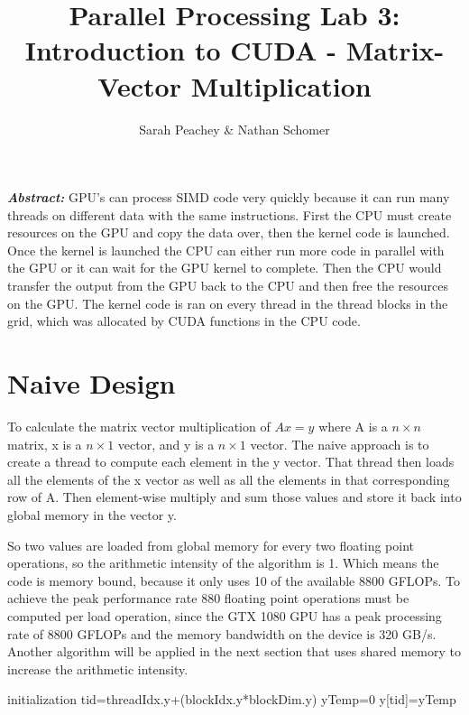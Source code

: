 \documentclass[12pt]{article}
\begin{document}
\title{Parallel Processing Lab 3: \\ Introduction to CUDA - Matrix-Vector
Multiplication}
\author{Sarah Peachey \& Nathan Schomer}
\maketitle

\textbf{\textit{Abstract:}} GPU's can process SIMD code very quickly because
it can run many threads on different data with the same instructions. First
the CPU must create resources on the GPU and copy the data over, then the
kernel code is launched. Once the kernel is launched the CPU can either run
more code in parallel with the GPU or it can wait for the GPU kernel to
complete. Then the CPU would transfer the output from the GPU back to the CPU 
and then free the resources on the GPU. The kernel code is ran on every
thread in the thread blocks in the grid, which was allocated by CUDA
functions in the CPU code.   
\newpage

\vspace{-1.5cm}
\section{Naive Design}
\vspace{-0.25cm}

\qquad To calculate the matrix vector multiplication of $Ax=y$ where A is a
$n \times n$ matrix, x is a $n \times 1$ vector, and y is a $n \times 1$
vector. The naive approach is to create a thread to compute each element in
the y vector. That thread then loads all the elements of the x vector as
well as all the elements in that corresponding row of A. Then element-wise
multiply and sum those values and store it back into global memory in the
vector y. 

So two values are loaded from global memory for every two floating
point operations, so the arithmetic intensity of the algorithm is 1. Which
means the code is memory bound, because it only uses 10 of the available 8800
GFLOPs. To achieve the peak
performance rate 880 floating point operations must be computed per load
operation, since the GTX 1080 GPU has a peak processing rate of 8800 GFLOPs and
the memory bandwidth on the device is 320 GB/s. Another algorithm will be
applied in the next section that uses shared memory to increase the
arithmetic intensity.  

\vspace{1cm}
\begin{algorithm}[H]
 	initialization\;
	tid=threadIdx.y+(blockIdx.y*blockDim.y)\;
	yTemp=0\;
	y[tid]=yTemp\; 
   	
\end{algorithm}
\end{document}

